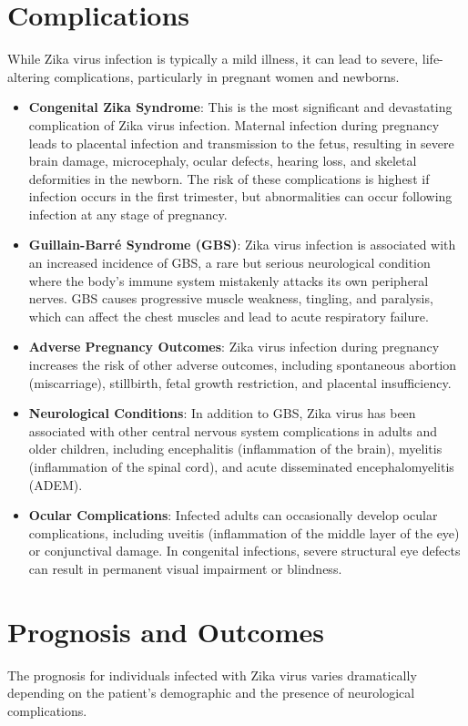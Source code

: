 \section*{Complications}
While Zika virus infection is typically a mild illness, it can lead to severe, life-altering complications, particularly in pregnant women and newborns.
\begin{itemize}
\item \textbf{Congenital Zika Syndrome}: This is the most significant and devastating complication of Zika virus infection. Maternal infection during pregnancy leads to placental infection and transmission to the fetus, resulting in severe brain damage, microcephaly, ocular defects, hearing loss, and skeletal deformities in the newborn. The risk of these complications is highest if infection occurs in the first trimester, but abnormalities can occur following infection at any stage of pregnancy.
\item \textbf{Guillain-Barr\'e Syndrome (GBS)}: Zika virus infection is associated with an increased incidence of GBS, a rare but serious neurological condition where the body's immune system mistakenly attacks its own peripheral nerves. GBS causes progressive muscle weakness, tingling, and paralysis, which can affect the chest muscles and lead to acute respiratory failure.
\item \textbf{Adverse Pregnancy Outcomes}: Zika virus infection during pregnancy increases the risk of other adverse outcomes, including spontaneous abortion (miscarriage), stillbirth, fetal growth restriction, and placental insufficiency.
\item \textbf{Neurological Conditions}: In addition to GBS, Zika virus has been associated with other central nervous system complications in adults and older children, including encephalitis (inflammation of the brain), myelitis (inflammation of the spinal cord), and acute disseminated encephalomyelitis (ADEM).
\item \textbf{Ocular Complications}: Infected adults can occasionally develop ocular complications, including uveitis (inflammation of the middle layer of the eye) or conjunctival damage. In congenital infections, severe structural eye defects can result in permanent visual impairment or blindness.
\end{itemize}

\section*{Prognosis and Outcomes}
The prognosis for individuals infected with Zika virus varies dramatically depending on the patient's demographic and the presence of neurological complications.


